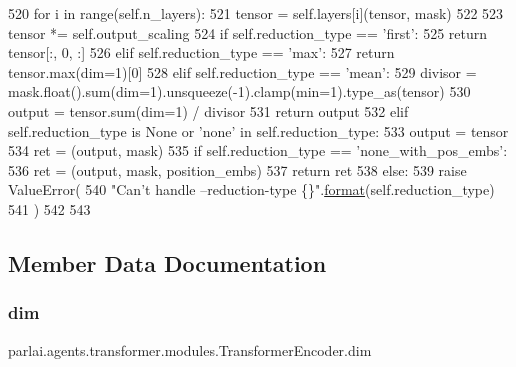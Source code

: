 \begin{DoxyCode}
520         \textcolor{keywordflow}{for} i \textcolor{keywordflow}{in} range(self.n\_layers):
521             tensor = self.layers[i](tensor, mask)
522 
523         tensor *= self.output\_scaling
524         \textcolor{keywordflow}{if} self.reduction\_type == \textcolor{stringliteral}{'first'}:
525             \textcolor{keywordflow}{return} tensor[:, 0, :]
526         \textcolor{keywordflow}{elif} self.reduction\_type == \textcolor{stringliteral}{'max'}:
527             \textcolor{keywordflow}{return} tensor.max(dim=1)[0]
528         \textcolor{keywordflow}{elif} self.reduction\_type == \textcolor{stringliteral}{'mean'}:
529             divisor = mask.float().sum(dim=1).unsqueeze(-1).clamp(min=1).type\_as(tensor)
530             output = tensor.sum(dim=1) / divisor
531             \textcolor{keywordflow}{return} output
532         \textcolor{keywordflow}{elif} self.reduction\_type \textcolor{keywordflow}{is} \textcolor{keywordtype}{None} \textcolor{keywordflow}{or} \textcolor{stringliteral}{'none'} \textcolor{keywordflow}{in} self.reduction\_type:
533             output = tensor
534             ret = (output, mask)
535             \textcolor{keywordflow}{if} self.reduction\_type == \textcolor{stringliteral}{'none\_with\_pos\_embs'}:
536                 ret = (output, mask, position\_embs)
537             \textcolor{keywordflow}{return} ret
538         \textcolor{keywordflow}{else}:
539             \textcolor{keywordflow}{raise} ValueError(
540                 \textcolor{stringliteral}{"Can't handle --reduction-type \{\}"}.\hyperlink{namespaceparlai_1_1chat__service_1_1services_1_1messenger_1_1shared__utils_a32e2e2022b824fbaf80c747160b52a76}{format}(self.reduction\_type)
541             )
542 
543 
\end{DoxyCode}


\subsection{Member Data Documentation}
\mbox{\label{classparlai_1_1agents_1_1transformer_1_1modules_1_1TransformerEncoder_ab56fa99f887753677dc7f4d435595114}} 
\subsubsection{\texorpdfstring{dim}{dim}}
{\footnotesize\ttfamily parlai.\+agents.\+transformer.\+modules.\+Transformer\+Encoder.\+dim}



